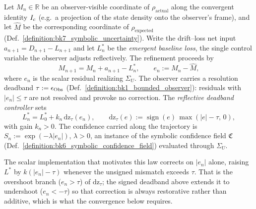 \begin{definition}
\label{definition:bk7_adaptive_refinement_recurrence}
Let $M_n\in\mathbb{R}$ be an observer-visible coordinate of $\rho_{\text{actual}}$
along the convergent identity $I_c$ (e.g.\ a projection of the state density
onto the observer's frame), and let $\hat{M}$ be the corresponding coordinate of
$\rho_{\text{expected}}$ (Def.~\ref{definition:bk7_symbolic_uncertainty}). Write
the drift--loss net input $a_{n+1}=D_{n+1}-L_{n+1}$ and let $L^{\ast}_{n}$ be the
\emph{emergent baseline loss}, the single control variable the observer adjusts
reflectively. The refinement proceeds by
\[
M_{n+1}=M_n+a_{n+1}-L^{\ast}_{n},
\qquad
e_n:=M_n-\hat{M},
\]
where $e_n$ is the scalar residual realizing $\Sigma_U$. The observer carries a
resolution deadband $\tau:=\epsilon_{\mathrm{Obs}}$ (Def.~\ref{definition:bk1_bounded_observer}):
residuals with $|e_n|\le\tau$ are not resolved and provoke no correction. The
\emph{reflective deadband controller} sets
\[
L^{\ast}_{n}=L^{\ast}_{0}+k_n\,\mathrm{dz}_{\tau}(e_n),
\qquad
\mathrm{dz}_{\tau}(e):=\operatorname{sign}(e)\,\max(|e|-\tau,\,0),
\]
with gain $k_n>0$. The confidence carried along the trajectory is
$S_n:=\exp(-\lambda|e_n|)$, $\lambda>0$, an instance of the symbolic confidence
field $\mathfrak{C}$ (Def.~\ref{definition:bk6_symbolic_confidence_field})
evaluated through $\Sigma_U$.
\end{definition}

\begin{remark}
\label{remark:bk7_one_sided_controller}
The scalar implementation that motivates this law corrects on $|e_n|$ alone,
raising $L^{\ast}$ by $k(|e_n|-\tau)$ whenever the unsigned mismatch exceeds
$\tau$. That is the overshoot branch ($e_n>\tau$) of $\mathrm{dz}_{\tau}$; the
signed deadband above extends it to undershoot ($e_n<-\tau$) so that correction is
always restorative rather than additive, which is what the convergence below
requires.
\end{remark}


